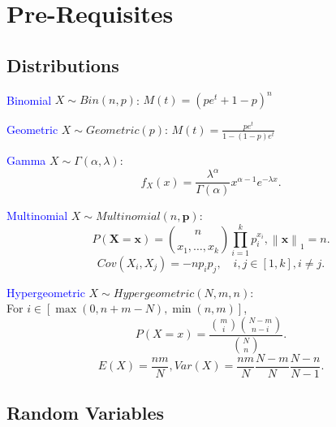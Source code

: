 \section{Pre-Requisites}
\subsection{Distributions}
\textcolor{Blue}{Binomial} $X\sim Bin(n,p)$: $M(t)={\left( pe^{t}+1-p \right)
}^{n}$

\textcolor{Blue}{Geometric} $X\sim Geometric(p)$: $M(t)={\frac{pe^{t}}{1-(1-p)e^{t}}}$

\textcolor{Blue}{Gamma} $X\sim \Gamma(\alpha, \lambda)$:
\[f_X\left( x \right) =
\frac{\lambda^{\alpha}}{\Gamma(\alpha)}x^{\alpha-1}e^{-\lambda x}.\] 

\textcolor{Blue}{Multinomial} $X\sim Multinomial(n, \mathbf{p})$:
\[P(\mathbf{X}=\mathbf{x})=\binom{n}{x_1,\ldots,x_k}\prod_{i=1}^{k} p_i^{x_i},\left\lVert \mathbf{x} \right\rVert_1 =n.\]
\[Cov(X_i,X_j)=-n p_i p_j, \quad i,j\in [1,k], i\neq j.\] 

\textcolor{Blue}{Hypergeometric} $X\sim Hypergeometric(N,m,n)$:\\
For $i\in \left[ \max{\left( 0,n+m-N \right) },\min{\left( n,m \right) } \right]$,
\[P\left( X=x \right) =\frac{\binom{m}{i}\binom{N-m}{n-i}}{\binom{N}{n}}.\] 
\[E(X)=\frac{nm}{N},Var(X)=\frac{nm}{N}\frac{N-m}{N}\frac{N-n}{N-1}.\] 

\subsection{Random Variables}
